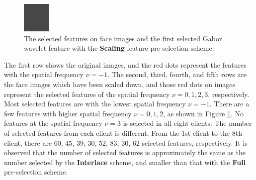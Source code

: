 \begin{figure}[ht]
 \includegraphics[width=\textwidth*11/100]{ch5/figures/firstgabor_Scaling_8.png}
\caption{The selected features on face images and the first selected Gabor wavelet feature with the \textbf{Scaling} feature pre-selection scheme.}
\label{fig:resultBGC1toC8scaling}
\end{figure} 
The first row shows the original images, and the red dots represent the features with the spatial frequency $\nu = -1$. The second, third, fourth, and fifth rows are the face images which have been scaled down, and those red dots on images represent the selected features of the spatial frequency $\nu=0,1,2,3$, respectively. Most selected features are with the lowest spatial frequency $\nu=-1$. There are a few features with higher spatial frequency $\nu=0,1,2$, as shown in \mbox{Figure} \ref{fig:resultBGC1toC8scaling}. No features at the spatial frequency $\nu=3$ is selected in all eight clients. The number of selected features from each client is different. From the 1st client to the 8th client, there are $60$, $45$, $39$, $30$, $52$, $83$, $30$, $62$ selected features, respectively. It is observed that the number of selected features is approximately the same as the number selected by the \textbf{Interlace} scheme, and smaller than that with the \textbf{Full} pre-selection scheme.

